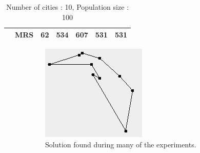 \documentclass[10pt,a4paper,openbib]{article}
\begin{document}
\begin{multicols}{2}
\begin{table}[H]
\begin{tabular}{|c|c|c|c|c|c|c|}
                                                     & MRS                                                & 62                                                  & 534                               & 607                                 & 531                                   & 531                                                    \\ \hline
\end{tabular}
\caption{Number of cities : 10, Population size : 100}
\label{table:10cities}
\end{table}



\begin{figure}[H]
\begin{center}
    \begin{subfigure}[b]{0.15\textwidth}
        \includegraphics[width=\textwidth]{images/result1/Binaryfalse2.png}
        \caption{Solution found during many of the experiments.}
        \label{fig:cities10Many}
    \end{subfigure}
    \begin{subfigure}[b]{0.15\textwidth}

\end{subfigure}
\end{center}
\end{figure}
\end{multicols}
\end{document}
